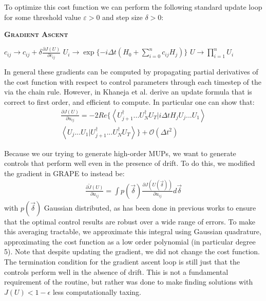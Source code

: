 \documentclass[aps,nofootinbib,pra,notitlepage,twocolumn]{revtex4-1}
\newcommand{\braket}[2]{\left\langle #1 | #2 \right\rangle}
\begin{document}
To optimize this cost function we can perform the following standard update loop for some threshold value $\varepsilon > 0$ and step size $\delta > 0$:
\begin{algorithm}[H]
  \caption{\textsc{\textbf{Gradient Ascent}}}
  \begin{algorithmic}
    \State $c_{ij} \rightarrow c_{ij} + \delta\frac{\partial J(U)}{\partial c_{ij}}$
    \State $U_i \rightarrow \exp\{-i\Delta t(H_0 + \sum_{i=0}^{n}c_{ij}H_j)\}$
    \EndFor
    \State $U \rightarrow \prod_{i=1}^nU_i$
    \EndWhile
  \end{algorithmic}
\end{algorithm}

In general these gradients can be computed by propagating partial derivatives of the cost function with respect to control parameters through each timestep of the  via the chain rule. However, in \cite{Khaneja2005} Khaneja et al. derive an update formula that is correct to first order, and efficient to compute. In particular one can show that:
\begin{equation}\label{eq:update}
  \begin{split}
\frac{\partial J(U)}{\partial u_{ij}} = -2Re\{\braket{{U_{j+1}^{\dagger}...U_N^{\dagger} U_T}}{i\Delta tH_jU_j...U_1}\\
\braket{U_j...U_1}{U_{j+1}^{\dagger}...U_N^{\dagger} U_T}\} +  \mathcal{O}(\Delta t^2)
  \end{split}
\end{equation}

Because we our trying to generate high-order MUPs, we want to generate controls that perform well even in the presence of drift. To do this, we modified the gradient in GRAPE to instead be:
\begin{align}\label{eq:quadrature}
\frac{\partial \tilde J(U)}{\partial u_{ij}} =
\int p(\vec{\delta})\frac{\partial J(U(\vec{\delta}))}{\partial u_{ij}} d\vec{\delta}
\end{align}
with $p(\vec{\delta})$ Gaussian distributed, as has been done in previous works \cite{Goerz2014} to ensure that the optimal control results are robust over a wide range of errors. To make this averaging tractable, we approximate this integral using Gaussian quadrature, approximating the cost function as a low order polynomial\cite{abramowiz1972handbook} (in particular degree 5). Note that despite updating the gradient, we did not change the cost function. The termination condition for the gradient ascent loop is still just that the controls perform well in the absence of drift. This is not a fundamental requirement of the routine, but rather was done to make finding solutions with $J(U) < 1 - \epsilon$  less computationally taxing.
\end{document}
